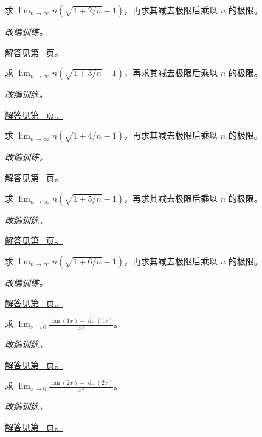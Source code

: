 \documentclass[12pt,fontset=fandol]{ctexart}
\begin{document}
\begin{example}[缩放后的根式增量]\label{ex:c5q8}
求 $\displaystyle\lim_{n\to\infty}n\left(\sqrt{1+2/n}-1\right)$，再求其减去极限后乘以 $n$ 的极限。
\par\textit{改编训练。}\par\hyperref[ans:c5q8]{解答见第~\pageref{ans:c5q8} 页。}
\end{example}
\begin{example}[缩放后的根式增量]\label{ex:c5q9}
求 $\displaystyle\lim_{n\to\infty}n\left(\sqrt{1+3/n}-1\right)$，再求其减去极限后乘以 $n$ 的极限。
\par\textit{改编训练。}\par\hyperref[ans:c5q9]{解答见第~\pageref{ans:c5q9} 页。}
\end{example}
\begin{example}[缩放后的根式增量]\label{ex:c5q10}
求 $\displaystyle\lim_{n\to\infty}n\left(\sqrt{1+4/n}-1\right)$，再求其减去极限后乘以 $n$ 的极限。
\par\textit{改编训练。}\par\hyperref[ans:c5q10]{解答见第~\pageref{ans:c5q10} 页。}
\end{example}
\begin{example}[缩放后的根式增量]\label{ex:c5q11}
求 $\displaystyle\lim_{n\to\infty}n\left(\sqrt{1+5/n}-1\right)$，再求其减去极限后乘以 $n$ 的极限。
\par\textit{改编训练。}\par\hyperref[ans:c5q11]{解答见第~\pageref{ans:c5q11} 页。}
\end{example}
\begin{example}[缩放后的根式增量]\label{ex:c5q12}
求 $\displaystyle\lim_{n\to\infty}n\left(\sqrt{1+6/n}-1\right)$，再求其减去极限后乘以 $n$ 的极限。
\par\textit{改编训练。}\par\hyperref[ans:c5q12]{解答见第~\pageref{ans:c5q12} 页。}
\end{example}
\begin{example}[三角函数差的三阶项]\label{ex:c5q13}
求 $\displaystyle\lim_{x\to0}\frac{\tan(1x)-\sin(1x)}{x^3}$。
\par\textit{改编训练。}\par\hyperref[ans:c5q13]{解答见第~\pageref{ans:c5q13} 页。}
\end{example}
\begin{example}[三角函数差的三阶项]\label{ex:c5q14}
求 $\displaystyle\lim_{x\to0}\frac{\tan(2x)-\sin(2x)}{x^3}$。
\par\textit{改编训练。}\par\hyperref[ans:c5q14]{解答见第~\pageref{ans:c5q14} 页。}
\end{example}
\end{document}
